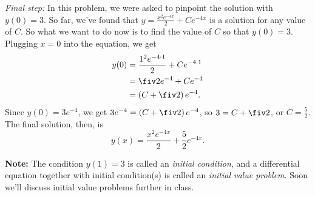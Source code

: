 \documentclass[11pt]{letter}
\begin{document}
\textit{Final step:} In this problem, we were asked to pinpoint the solution with $y(0)=3$. So far, we've found that $y = \frac{x^2e^{-4x}}{2} + Ce^{-4x}$ is a solution for any value of $C$. So what we want to do now is to find the value of $C$ so that $y(0)=3$. Plugging $x=0$ into the equation, we get
\begin{align*}
	y(0) &= \frac{1^2e^{-4\cdot 1}}{2} + Ce^{-4\cdot 1}\\
		&= \fiv 2e^{-4}+Ce^{-4}\\
		&= \left(C+\fiv 2\right)e^{-4}.
\end{align*}
Since $y(0)=3e^{-4}$, we get $3e^{-4}=\left(C+\fiv 2\right)e^{-4}$, so $3=C+\fiv 2$, or $C=\frac52$.
The final solution, then, is
\[
y(x) = \frac{x^2e^{-4x}}{2} + \frac52 e^{-4x}.
\]

\textbf{Note:} The condition $y(1)=3$ is called an \emph{initial condition}, and a differential equation together with initial condition(s) is called an \emph{initial value problem}. Soon we'll discuss initial value problems further in class.
\end{document}
